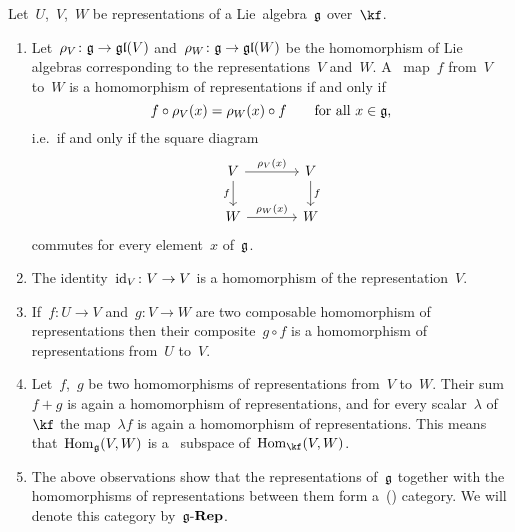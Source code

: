 \begin{remark}
  Let~$U$,~$V$,~$W$ be representations of a Lie~algebra~$\mathfrak{g}$ over~$\kf$.
  \begin{enumerate}
    \item
      Let~$\rho_V \colon \glie \to \gllie(V)$ and~$\rho_W \colon \glie \to \gllie(W)$ be the homomorphism of Lie algebras corresponding to the representations~$V$ and~$W$.
      A~{\linear{$\kf$}} map~$f$ from~$V$ to~$W$ is a homomorphism of representations if and only if
      \[
        f \circ \rho_V(x)
        =
        \rho_W(x) \circ f
        \qquad
        \text{for all~$x \in \mathfrak{g}$,}
      \]
      i.e.\ if and only if the square diagram
      \[
        \begin{tikzcd}[column sep = large]
          V
          \arrow{r}[above]{\rho_V(x)}
          \arrow{d}[left]{f}
          &
          V
          \arrow{d}[right]{f}
          \\
          W
          \arrow{r}[above]{\rho_W(x)}
          &
          W
        \end{tikzcd}
      \]
      commutes for every element~$x$ of~$\mathfrak{g}$.
    \item
      The identity~$\id_V \colon V \to V$ is a homomorphism of the representation~$V$.
    \item
      If~$f \colon U \to V$ and~$g \colon V \to W$ are two composable homomorphism of representations then their composite~$g \circ f$ is a homomorphism of representations from~$U$ to~$V$.
    \item
      Let~$f$,~$g$ be two homomorphisms of representations from~$V$ to~$W$.
      Their sum~$f + g$ is again a homomorphism of representations, and for every scalar~$\lambda$ of~$\kf$ the map~$\lambda f$ is again a homomorphism of representations.
      This means that~$\operatorname{Hom}_{\mathfrak{g}}(V,W)$ is a~{\linear{$\kf$}} subspace of~$\Hom_{\kf}(V,W)$.
    \item
      The above observations show that the representations of~$\mathfrak{g}$ together with the homomorphisms of representations between them form a~(\linear{$\kf$}) category.
      We will denote this category by~$\mathfrak{g}\text{-}\mathbf{Rep}$.


\end{enumerate}
\end{remark}
